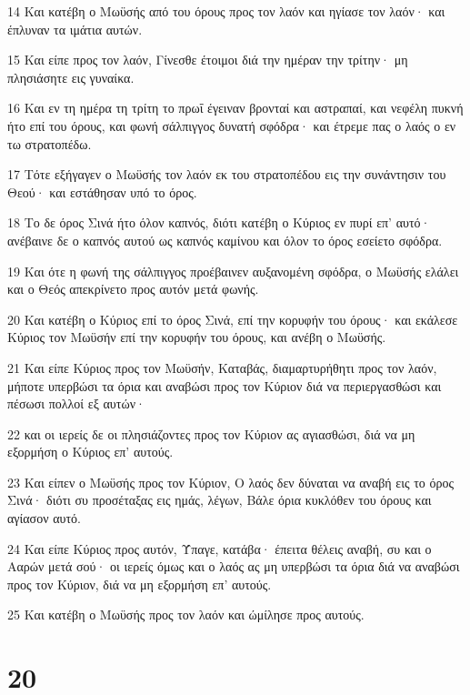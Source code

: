 \par 14 Και κατέβη ο Μωϋσής από του όρους προς τον λαόν και ηγίασε τον λαόν· και έπλυναν τα ιμάτια αυτών.
\par 15 Και είπε προς τον λαόν, Γίνεσθε έτοιμοι διά την ημέραν την τρίτην· μη πλησιάσητε εις γυναίκα.
\par 16 Και εν τη ημέρα τη τρίτη το πρωΐ έγειναν βρονταί και αστραπαί, και νεφέλη πυκνή ήτο επί του όρους, και φωνή σάλπιγγος δυνατή σφόδρα· και έτρεμε πας ο λαός ο εν τω στρατοπέδω.
\par 17 Τότε εξήγαγεν ο Μωϋσής τον λαόν εκ του στρατοπέδου εις την συνάντησιν του Θεού· και εστάθησαν υπό το όρος.
\par 18 Το δε όρος Σινά ήτο όλον καπνός, διότι κατέβη ο Κύριος εν πυρί επ' αυτό· ανέβαινε δε ο καπνός αυτού ως καπνός καμίνου και όλον το όρος εσείετο σφόδρα.
\par 19 Και ότε η φωνή της σάλπιγγος προέβαινεν αυξανομένη σφόδρα, ο Μωϋσής ελάλει και ο Θεός απεκρίνετο προς αυτόν μετά φωνής.
\par 20 Και κατέβη ο Κύριος επί το όρος Σινά, επί την κορυφήν του όρους· και εκάλεσε Κύριος τον Μωϋσήν επί την κορυφήν του όρους, και ανέβη ο Μωϋσής.
\par 21 Και είπε Κύριος προς τον Μωϋσήν, Καταβάς, διαμαρτυρήθητι προς τον λαόν, μήποτε υπερβώσι τα όρια και αναβώσι προς τον Κύριον διά να περιεργασθώσι και πέσωσι πολλοί εξ αυτών·
\par 22 και οι ιερείς δε οι πλησιάζοντες προς τον Κύριον ας αγιασθώσι, διά να μη εξορμήση ο Κύριος επ' αυτούς.
\par 23 Και είπεν ο Μωϋσής προς τον Κύριον, Ο λαός δεν δύναται να αναβή εις το όρος Σινά· διότι συ προσέταξας εις ημάς, λέγων, Βάλε όρια κυκλόθεν του όρους και αγίασον αυτό.
\par 24 Και είπε Κύριος προς αυτόν, Ύπαγε, κατάβα· έπειτα θέλεις αναβή, συ και ο Ααρών μετά σού· οι ιερείς όμως και ο λαός ας μη υπερβώσι τα όρια διά να αναβώσι προς τον Κύριον, διά να μη εξορμήση επ' αυτούς.
\par 25 Και κατέβη ο Μωϋσής προς τον λαόν και ώμίλησε προς αυτούς.

\chapter{20}

